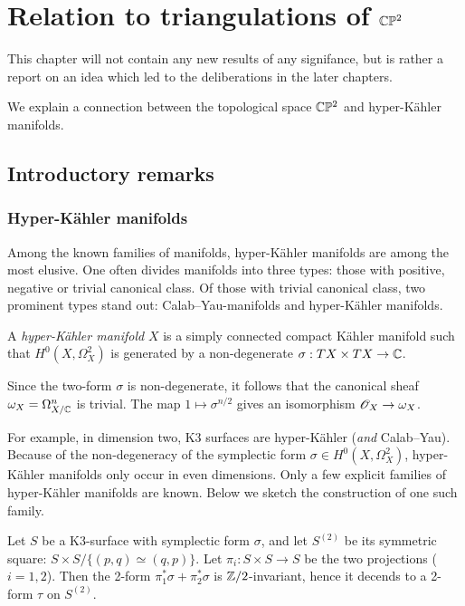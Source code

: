 \chapter{Relation to triangulations of \texorpdfstring{$\mathbb{C}\mathbb{P}^2$}{CP2}}
\label{sec:cp2triangs}

This chapter will not contain any new results of any signifance, but is rather a report on an idea which led to the deliberations in the later chapters.

We explain a connection between the topological space $\mathbb{C} \mathbb{P}^2$ and hyper-Kähler manifolds.

\section{Introductory remarks} %

\subsection{Hyper-Kähler manifolds}
\label{sec:hyper_kähler_manifolds}

Among the known families of manifolds, hyper-Kähler manifolds are among the most elusive. One often divides manifolds into three types: those with positive, negative or trivial canonical class. Of those with trivial canonical class, two prominent types stand out: Calab--Yau-manifolds and hyper-Kähler manifolds.

\begin{definition}
A \emph{hyper-Kähler manifold} $X$ is a simply connected compact Kähler manifold such that $H^0(X, \Omega_X^2)$ is generated by a non-degenerate $\sigma: TX \times TX \to \mathbb{C}$.
\end{definition}

\begin{remark}
Since the two-form $\sigma$ is non-degenerate, it follows that the canonical sheaf $\omega_X=\Omega_{X/\mathbb{C}}^n$ is trivial. The map $1 \mapsto \sigma^{n/2}$ gives an isomorphism $\mathscr{O}_X \to \omega_X$. 
\end{remark}

For example, in dimension two, K3 surfaces are hyper-Kähler (\emph{and} Calab--Yau). Because of the non-degeneracy of the symplectic form $\sigma \in H^0(X, \Omega_X^2)$, hyper-Kähler manifolds only occur in even dimensions. Only a few explicit families of hyper-Kähler manifolds are known. Below we sketch the construction of one such family.

Let $S$ be a K3-surface with symplectic form $\sigma$, and let $S^{(2)}$ be its symmetric square: $S \times S / \{ (p,q) \simeq (q,p) \}$. Let $\pi_i:S \times S \to S$ be the two projections ($i=1,2$). Then the 2-form $\pi_1^\ast \sigma + \pi_2^\ast \sigma$ is $\mathbb{Z}/2$-invariant, hence it decends to a 2-form  $\tau$ on $S^{(2)}$.

